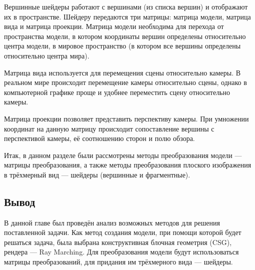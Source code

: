 Вершинные  шейдеры  работают  с  вершинами  (из  списка  вершин)  и 
отображают  их  в  пространстве.
Шейдеру  передаются  три  матрицы:  матрица модели, матрица вида и матрица проекции.
Матрица  модели  необходима  для  перехода  от  пространства  модели,  в 
котором  координаты  вершин  определены  относительно  центра  модели,  в 
мировое пространство (в котором все вершины определены относительно центра 
мира).

Матрица вида используется для перемещения сцены относительно камеры.
В реальном мире происходит перемещение камеры относительно сцены, однако 
в  компьютерной  графике  проще  и  удобнее  переместить  сцену 
относительно камеры.

Матрица  проекции  позволяет  представить  перспективу  камеры.
При умножении координат на данную матрицу происходит сопоставление вершины с перспективой камеры, её соотношению сторон и полю обзора.




Итак, в данном разделе были рассмотрены методы преобразования модели 
--- матрицы  преобразования,  а  также  методы  преобразования  плоского 
изображения в трёхмерный вид --- шейдеры (вершинные и фрагментные). 

\subsection*{Вывод}
В  данной  главе  был  проведён  анализ  возможных  методов  для  решения 
поставленной задачи.
Как метод создания  модели, при помощи которой будет 
решаться  задача,  была  выбрана  конструктивная  блочная геометрия  (CSG), 
рендера  ---  Ray Marching.
Для  преобразования  модели  будут  использоваться 
матрицы преобразований, для придания им трёхмерного вида --- шейдеры.
